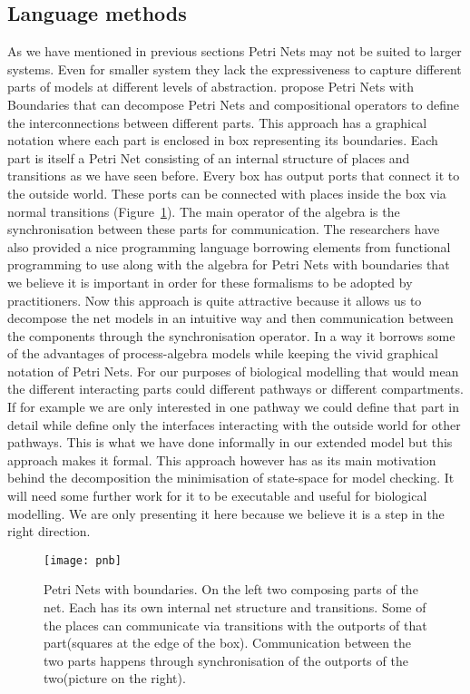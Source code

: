 \subsection{Language methods}
As we have mentioned in previous sections Petri Nets may not be suited
to larger systems. Even for smaller system they lack the
expressiveness to capture different parts of models at different
levels of abstraction. \citet{DBLP:journals/corr/abs-1304-3121} propose Petri Nets with
Boundaries that can decompose Petri Nets and compositional operators
to define the interconnections between different parts. This approach
has a graphical notation where each part is enclosed in box
representing its boundaries. Each part is itself a Petri Net
consisting of an internal structure of places and transitions as we
have seen before. Every box has output ports that connect it to the
outside world. These ports can be connected with places inside the box
via normal transitions (Figure~\ref{fig:pnb}). The main operator of the algebra is the
synchronisation between these parts for communication. The researchers
have also provided a nice programming language borrowing elements from
functional programming to use along with the
algebra for Petri Nets with boundaries that we believe it is important
in order for these formalisms to be adopted by practitioners. Now this
approach is quite attractive because it allows us to decompose the net
models in an intuitive way and then communication between the
components through the synchronisation operator. In a way it borrows
some of the advantages of process-algebra models while keeping the
vivid graphical notation of Petri Nets. For our purposes of biological
modelling that would mean the different interacting parts could
different pathways or different compartments. If for example we are
only interested in one pathway we could define that part in detail
while define only the interfaces interacting with the outside world
for other pathways. This is what we have done informally in our
extended model but this approach makes it formal. This approach
however has as its main motivation behind the decomposition the
minimisation of state-space for model checking. It will need some
further work for it to be executable and useful for biological
modelling. We are only presenting it here because we believe it is a step
in the right direction.

\begin{figure}[htbp!]
\centering
\texttt{[image: pnb]}
\caption[Petri Nets with boundaries]{Petri Nets with boundaries. On
  the left two composing parts of the net. Each has its own internal
  net structure and transitions. Some of the places can communicate
  via transitions with the outports of that part(squares at the edge
  of the box). Communication between the two parts happens through
  synchronisation of the outports of the two(picture on the right).}
\label{fig:pnb}
\end{figure}

